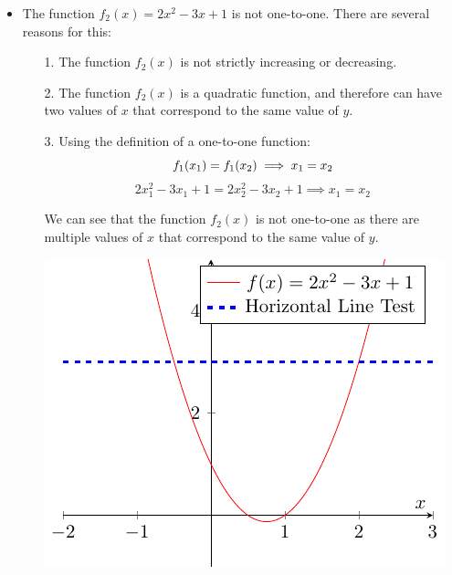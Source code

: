 \documentclass[12pt]{report}
\begin{document}
\begin{enumerate}[leftmargin=\labelsep]
\begin{enumerate}
\begin{tcolorbox}
                    \begin{itemize}[label={}]
                        \item The function $f_2(x)=2x^2-3x+1$ is not one-to-one. There are several reasons for this:
                        \begin{enumerate}
                            \item[1.] The function $f_2(x)$ is not strictly increasing or decreasing.
                            \item[2.] The function $f_2(x)$ is a quadratic function, and therefore can have two values of $x$ that correspond to the same value of $y$. 
                            \item[3.] Using the definition of a one-to-one function:
                            \begin{equation*}
                                f_1(x_1) = f_1(x_2) \implies x_1 = x_2 \\
                            \end{equation*} 
                            \begin{equation*}
                                2x_1^2-3x_1+1 = 2x_2^2-3x_2+1 \implies x_1 = x_2
                            \end{equation*}
                            \item[] We can see that the function $f_2(x)$ is not one-to-one as there are multiple values of $x$ that correspond to the same value of $y$.
                            \begin{center}
                                \includegraphics[width=0.8\linewidth]{lib/figures/Figure1.pdf}
                            \end{center}
                        \end{enumerate}
                    \end{itemize}
                \end{tcolorbox}


\end{enumerate}
\end{enumerate}
\end{document}
